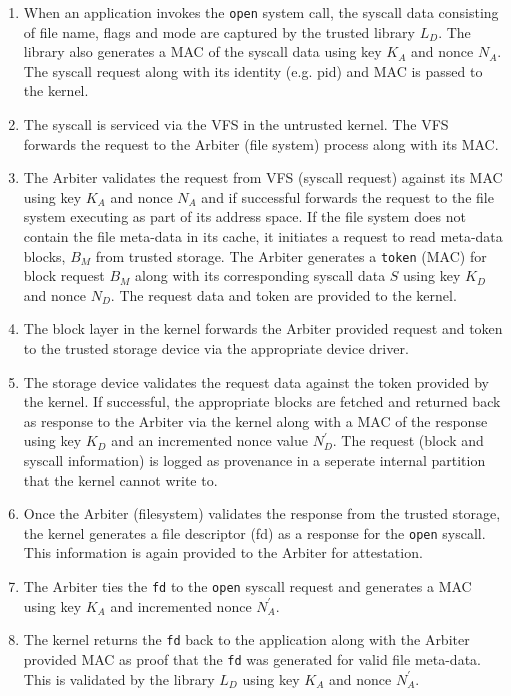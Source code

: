 \documentclass[withindex,glossary]{cam-thesis}
\begin{document}
\begin{enumerate}[Step 1:]

\item When an application invokes the \texttt{open} system call, the syscall data consisting of file name, flags and mode are captured by the trusted library $L_D$.
The library also generates a MAC of the syscall data using key $K_A$ and nonce $N_A$.
The syscall request along with its identity (e.g. pid) and MAC is passed to the kernel.

\item The syscall is serviced via the VFS in the untrusted kernel. The VFS forwards the request to the Arbiter (file system) process along with its MAC.

\item The Arbiter validates the request from VFS (syscall request) against its MAC using key $K_A$ and nonce $N_A$ and if successful forwards the request to the file system executing as part of its address space.
If the file system does not contain the file meta-data in its cache, it initiates a request to read meta-data blocks, $B_M$ from trusted storage.
The Arbiter generates a \texttt{token} (MAC) for block request $B_M$ along with its corresponding syscall data $S$ using key $K_D$ and nonce $N_D$.
The request data and token are provided to the kernel.

\item The block layer in the kernel forwards the Arbiter provided request and token to the trusted storage device via the appropriate device driver.

\item The storage device validates the request data against the token provided by the kernel.
If successful, the appropriate blocks are fetched and returned back as response to the Arbiter via the kernel along with a MAC of the response using key $K_D$ and an incremented nonce value $N^\prime_D$.
The request (block and syscall information) is logged as provenance in a seperate internal partition that the kernel cannot write to.

\item Once the Arbiter (filesystem) validates the response from the trusted storage, the kernel generates a file descriptor (fd) as a response for the \texttt{open} syscall.
This information is again provided to the Arbiter for attestation.

\item The Arbiter ties the \texttt{fd} to the \texttt{open} syscall request and generates a MAC using key $K_A$ and incremented nonce $N^\prime_A$.  

\item The kernel returns the \texttt{fd} back to the application along with the Arbiter provided MAC as proof that the \texttt{fd} was generated for valid file meta-data.
This is validated by the library $L_D$ using key $K_A$ and nonce $N^\prime_A$.

\end{enumerate}
\end{document}
